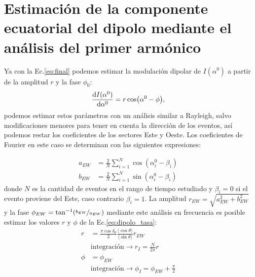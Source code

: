 \section{Estimación de la componente ecuatorial del dipolo mediante el análisis del  primer armónico}

Ya con la Ec.\ref{eq:final} podemos estimar la modulación dipolar de $I(\alpha^0)$ a partir de la amplitud $r$ y la fase $\phi_0$:
\begin{equation}
    \dv{I(\alpha^0)}{\alpha^0} = r \cos(\alpha^0 - \phi),
    \label{eq:dipolo_tasa}
\end{equation}
podemos estimar estos parámetros con un análisis similar a  Rayleigh, salvo modificaciones menores para tener en cuenta la dirección de los eventos, así podemos restar los coeficientes de los sectores Este y Oeste. Los coeficientes de Fourier en este caso se determinan con las siguientes expresiones:

\begin{align*}
    a_{EW} &= \frac{2}{N} \sum^N_{i=1} \cos(\alpha^0_i - \beta_i)\\
    b_{EW} &= \frac{2}{N} \sum^N_{i=1} \sin(\alpha^0_i - \beta_i)
\end{align*}
donde $N$ es la cantidad de eventos en el rango de tiempo estudiado y $\beta_i=0$ si el evento proviene del Este, caso contrario $\beta_i=1$. La amplitud  $r_{EW} = \sqrt{a_{EW}^2 + b_{EW}^2}$ y la fase $\phi_{EW} = \tan^{-1}(\nicefrac{b_{EW}}{a_{EW}})$ mediante este análisis en frecuencia es posible estimar los valores $r$ y $\phi$ de la Ec.\ref{eq:dipolo_tasa}:
\begin{align*}
    r &= \frac{\pi \cos\delta_0}{2} \frac{\langle\cos\theta \rangle}{\langle\sin\theta \rangle} r_{EW} \\ 
    &\text{integración} \rightarrow r_I =\frac{N}{2\pi}r \\
    \phi &= \phi_{EW} \\
    &\text{integración} \rightarrow \phi_I = \phi_{EW} + \frac{\pi}{2}
\end{align*}


